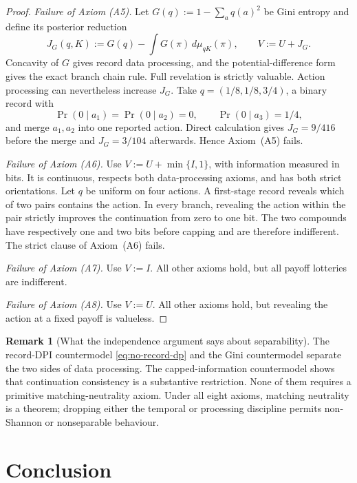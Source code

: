 \documentclass[11pt,a4paper]{article}
\theoremstyle{definition}
\newtheorem{remark}[theorem]{Remark}
\newcommand{\1}{\mathbf 1}
\begin{document}
\begin{proof}
\emph{Failure of Axiom \textup{(A5)}.}
Let $G(q):=1-\sum_aq(a)^2$ be Gini entropy and define its posterior reduction
\[
 J_G(q,K):=G(q)-\int G(\pi)\,d\mu_{qK}(\pi),
 \qquad V:=U+J_G.
\]
Concavity of $G$ gives record data processing, and the potential-difference form gives the exact branch chain rule.
Full revelation is strictly valuable.  Action processing can nevertheless increase $J_G$.  Take
$q=(1/8,1/8,3/4)$, a binary record with
\[
 \Pr(0\mid a_1)=\Pr(0\mid a_2)=0,
 \qquad \Pr(0\mid a_3)=1/4,
\]
and merge $a_1,a_2$ into one reported action.  Direct calculation gives $J_G=9/416$ before the merge and
$J_G=3/104$ afterwards.  Hence Axiom~\textup{(A5)} fails.

\emph{Failure of Axiom \textup{(A6)}.}
Use $V:=U+\min\{I,1\}$, with information measured in bits.  It is continuous, respects both data-processing axioms,
and has both strict orientations.  Let $q$ be uniform on four actions.  A first-stage record reveals which of two pairs
contains the action.  In every branch, revealing the action within the pair strictly improves the continuation from
zero to one bit.  The two compounds have respectively one and two bits before capping and are therefore indifferent.
The strict clause of Axiom~\textup{(A6)} fails.

\emph{Failure of Axiom \textup{(A7)}.}
Use $V:=I$.  All other axioms hold, but all payoff lotteries are indifferent.

\emph{Failure of Axiom \textup{(A8)}.}
Use $V:=U$.  All other axioms hold, but revealing the action at a fixed payoff is valueless.
\end{proof}

\begin{remark}[What the independence argument says about separability]
The record-DPI countermodel \eqref{eq:no-record-dp} and the Gini countermodel separate the two sides of data processing.
The capped-information countermodel shows that continuation consistency is a substantive restriction.  None of them requires a primitive
matching-neutrality axiom.  Under all eight axioms, matching neutrality is a theorem; dropping either the temporal or
processing discipline permits non-Shannon or nonseparable behaviour.
\end{remark}

\section{Conclusion}
\end{document}

